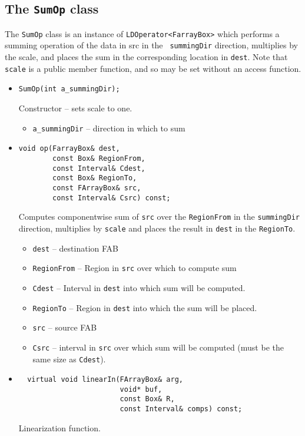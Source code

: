 \subsection{The {\tt SumOp} class}
The {\tt SumOp} class is an instance of {\tt LDOperator<FarrayBox>}
which performs a summing operation of the data in src in the {\tt
  summingDir} direction, multiplies by the scale, and places the sum
in the corresponding location in {\tt dest}.  Note that {\tt scale} is
a public member function, and so may be set without an access
function. 
\begin{itemize}
\item 
\begin{verbatim}
SumOp(int a_summingDir);
\end{verbatim}
Constructor -- sets scale to one.
\begin{itemize}
\item \verb/a_summingDir/ -- direction in which to sum
\end{itemize}

\item
\begin{verbatim}
void op(FarrayBox& dest,
        const Box& RegionFrom,
        const Interval& Cdest, 
        const Box& RegionTo,
        const FArrayBox& src,
        const Interval& Csrc) const;
\end{verbatim}
Computes componentwise sum of {\tt src} over the {\tt RegionFrom} in
  the {\tt summingDir} direction, multiplies by {\tt scale} and places
  the result in {\tt dest} in the {\tt RegionTo}. 
\begin{itemize}
\item \verb/dest/ -- destination FAB
\item \verb/RegionFrom/ -- Region in {\tt src} over which to compute sum
\item \verb/Cdest/ -- Interval in {\tt dest} into which sum will be
  computed. 
\item \verb/RegionTo/ -- Region in {\tt dest} into which the sum will
  be placed.
\item \verb/src/ -- source FAB
\item \verb/Csrc/ -- interval in {\tt src} over which sum will be
  computed (must be the same size as {\tt Cdest}).
\end{itemize}

\item
\begin{verbatim}
  virtual void linearIn(FArrayBox& arg,  
                        void* buf, 
                        const Box& R,
                        const Interval& comps) const;
\end{verbatim}
Linearization function.

\end{itemize}

